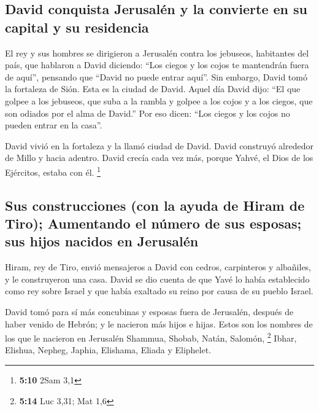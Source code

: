 \begin{paracol}{2}
\hypertarget{david-conquista-jerusaluxe9n-y-la-convierte-en-su-capital-y-su-residencia}{%
\subsection{David conquista Jerusalén y la convierte en su capital y su
residencia}\label{david-conquista-jerusaluxe9n-y-la-convierte-en-su-capital-y-su-residencia}}

 El rey y sus hombres se dirigieron a Jerusalén contra los
jebuseos, habitantes del país, que hablaron a David diciendo: ``Los
ciegos y los cojos te mantendrán fuera de aquí'', pensando que ``David
no puede entrar aquí''.  Sin embargo, David tomó la
fortaleza de Sión. Esta es la ciudad de David.  Aquel día
David dijo: ``El que golpee a los jebuseos, que suba a la rambla y
golpee a los cojos y a los ciegos, que son odiados por el alma de
David.'' Por eso dicen: ``Los ciegos y los cojos no pueden entrar en la
casa''.

 David vivió en la fortaleza y la llamó ciudad de David.
David construyó alrededor de Millo y hacia adentro. 
David crecía cada vez más, porque Yahvé, el Dios de los Ejércitos,
estaba con él. \footnote{\textbf{5:10} 2Sam 3,1}

\hypertarget{sus-construcciones-con-la-ayuda-de-hiram-de-tiro-aumentando-el-nuxfamero-de-sus-esposas-sus-hijos-nacidos-en-jerusaluxe9n}{%
\subsection{Sus construcciones (con la ayuda de Hiram de Tiro);
Aumentando el número de sus esposas; sus hijos nacidos en
Jerusalén}\label{sus-construcciones-con-la-ayuda-de-hiram-de-tiro-aumentando-el-nuxfamero-de-sus-esposas-sus-hijos-nacidos-en-jerusaluxe9n}}

 Hiram, rey de Tiro, envió mensajeros a David con cedros,
carpinteros y albañiles, y le construyeron una casa. 
David se dio cuenta de que Yavé lo había establecido como rey sobre
Israel y que había exaltado su reino por causa de su pueblo Israel.

 David tomó para sí más concubinas y esposas fuera de
Jerusalén, después de haber venido de Hebrón; y le nacieron más hijos e
hijas.  Estos son los nombres de los que le nacieron en
Jerusalén Shammua, Shobab, Natán, Salomón, \footnote{\textbf{5:14} Luc
  3,31; Mat 1,6}  Ibhar, Elishua, Nepheg, Japhia,
 Elishama, Eliada y Eliphelet.


\end{paracol}
